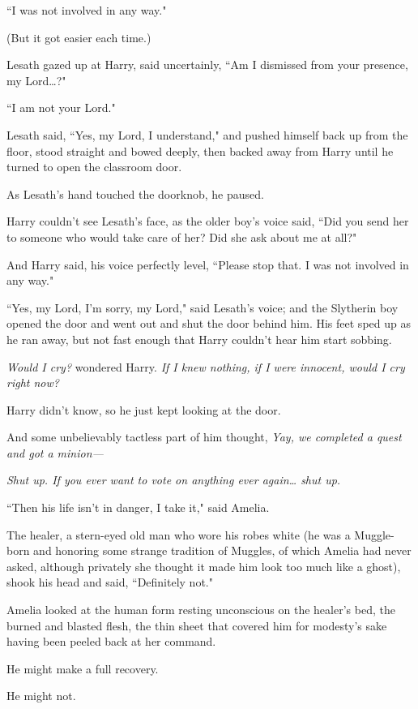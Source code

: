 ``I was not involved in any way."

(But it got easier each time.)

Lesath gazed up at Harry, said uncertainly, ``Am I dismissed from your presence, my Lord{\ldots}?"

``I am not your Lord."

Lesath said, ``Yes, my Lord, I understand," and pushed himself back up from the floor, stood straight and bowed deeply, then backed away from Harry until he turned to open the classroom door.

As Lesath's hand touched the doorknob, he paused.

Harry couldn't see Lesath's face, as the older boy's voice said, ``Did you send her to someone who would take care of her? Did she ask about me at all?"

And Harry said, his voice perfectly level, ``Please stop that. I was not involved in any way."

``Yes, my Lord, I'm sorry, my Lord," said Lesath's voice; and the Slytherin boy opened the door and went out and shut the door behind him. His feet sped up as he ran away, but not fast enough that Harry couldn't hear him start sobbing.

\emph{Would I cry?} wondered Harry. \emph{If I knew nothing, if I were innocent, would I cry right now?}

Harry didn't know, so he just kept looking at the door.

And some unbelievably tactless part of him thought, \emph{Yay, we completed a quest and got a minion—}

\emph{Shut up. If you ever want to vote on anything ever again{\ldots} shut up.}


``Then his life isn't in danger, I take it," said Amelia.

The healer, a stern-eyed old man who wore his robes white (he was a Muggle-born and honoring some strange tradition of Muggles, of which Amelia had never asked, although privately she thought it made him look too much like a ghost), shook his head and said, ``Definitely not."

Amelia looked at the human form resting unconscious on the healer's bed, the burned and blasted flesh, the thin sheet that covered him for modesty's sake having been peeled back at her command.

He might make a full recovery.

He might not.

